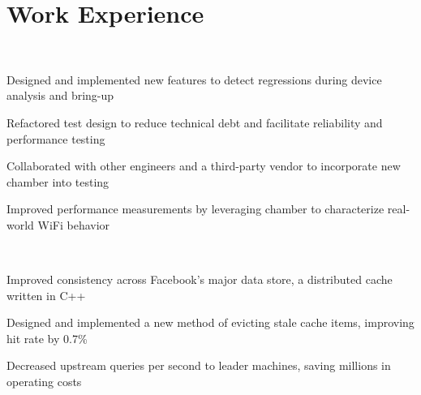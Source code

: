 \documentclass[]{resume-style}
\begin{document}
\vspace{-1mm}

\section{\hfill Work Experience \hfill}

 \\
\vspace{0.5mm}
\begin{tightemize}
\vspace{0.1mm}
\item Designed and implemented new features to detect regressions during device analysis and bring-up
\item Refactored test design to reduce technical debt and facilitate reliability and performance testing
\item Collaborated with other engineers and a third-party vendor to incorporate new chamber into testing
\item Improved performance measurements by leveraging chamber to characterize real-world WiFi behavior
\end{tightemize}
\vspace{2mm}
\vspace{0.25mm}
 \\
\vspace{1.5mm}
\begin{tightemize}
\vspace{-1.0mm}
\item Improved consistency across Facebook's major data store, a distributed cache written in C++
\item Designed and implemented a new method of evicting stale cache items, improving hit rate by 0.7\%
\item Decreased upstream queries per second to leader machines, saving millions in operating costs
\end{tightemize}
\end{document}
